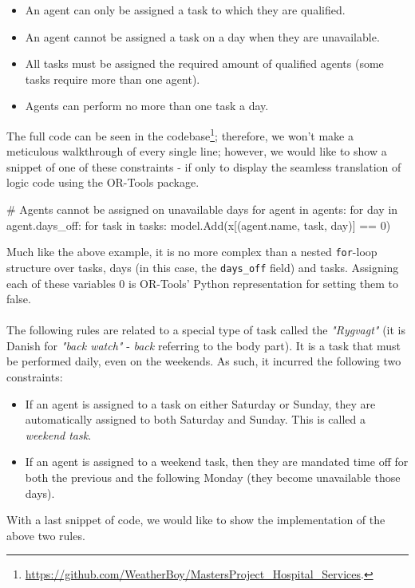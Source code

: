 \begin{itemize}
	\item An agent can only be assigned a task to which they are qualified.
	\item An agent cannot be assigned a task on a day when they are unavailable.
	\item All tasks must be assigned the required amount of qualified agents (some tasks require more than one agent).
	\item Agents can perform no more than one task a day.
\end{itemize}
The full code can be seen in the codebase\footnote{\href{https://github.com/WeatherBoy/MastersProject_Hospital_Services}{https://github.com/WeatherBoy/MastersProject\_Hospital\_Services}.}; therefore, we won't make a meticulous walkthrough of every single line; however, we would like to show a snippet of one of these constraints - if only to display the seamless translation of logic code using the OR-Tools package.
\begin{python}
# Agents cannot be assigned on unavailable days
for agent in agents:
    for day in agent.days_off:
        for task in tasks:
            model.Add(x[(agent.name, task, day)] == 0)
\end{python}
Much like the above example, it is no more complex than a nested \texttt{for}-loop structure over tasks, days (in this case, the \texttt{days_off} field) and tasks. Assigning each of these variables \(0\) is OR-Tools' Python representation for setting them to false.
\\
\\ 
The following rules are related to a special type of task called the \emph{"Rygvagt"} (it is Danish for \emph{"back watch"} - \emph{back} referring to the body part). It is a task that must be performed daily, even on the weekends. As such, it incurred the following two constraints:
\begin{itemize}
	\item If an agent is assigned to a task on either Saturday or Sunday, they are automatically assigned to both Saturday and Sunday. This is called a \emph{weekend task}.
	\item If an agent is assigned to a weekend task, then they are mandated time off for both the previous and the following Monday (they become unavailable those days).
\end{itemize}
With a last snippet of code, we would like to show the implementation of the above two rules.
